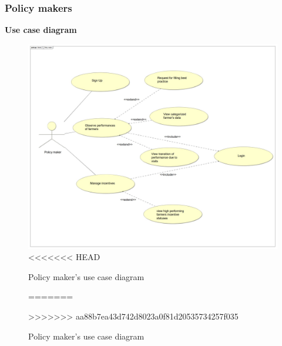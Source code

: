 \subsubsection{Policy makers}
\textbf{\textcolor{myblue}{Use case diagram}}
\begin{figure}[H]
	\centering
    \includegraphics[page=1, width=\textwidth]{Images/ud_policy.JPG}
<<<<<<< HEAD
	\caption{\label{fig:pm_use_case_diagram}Policy maker's use case diagram}
=======
	\caption{\label{fig:use_case_diagram}Policy maker's use case diagram}
>>>>>>> aa88b7ea43d742d8023a0f81d20535734257f035
\end{figure}
\label{sect:policy_maker_requirements}



